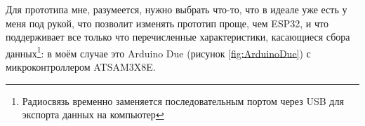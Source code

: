 \documentclass[a4paper, 10pt, final]{article} %
\begin{document}
        

    Для прототипа мне, разумеется, нужно выбрать что-то, что в идеале уже есть у меня под рукой, что позволит изменять прототип проще, чем ESP32, и что поддерживает все только что перечисленные характеристики, касающиеся сбора данных\footnote{Радиосвязь временно заменяется последовательным портом через USB для экспорта данных на компьютер}: в моём случае это Arduino Due (рисунок \ref{fig:ArduinoDue}) с микроконтроллером ATSAM3X8E.
\end{document}
